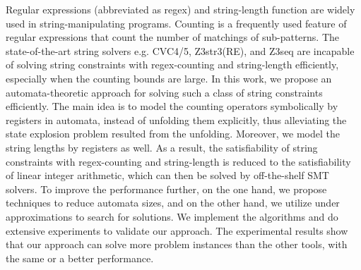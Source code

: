 
%

Regular expressions (abbreviated as regex) and string-length function are widely used in string-manipulating programs. 
Counting is a frequently used feature of regular expressions that count the number of matchings of sub-patterns. The state-of-the-art string solvers e.g. CVC4/5, Z3str3(RE), and Z3seq are incapable of solving string constraints with regex-counting and string-length efficiently, especially when the counting bounds are large. In this work, we propose an automata-theoretic approach for solving such a class of string constraints efficiently. 
%
The main idea is to model the counting operators symbolically by registers in automata, instead of unfolding them explicitly, thus alleviating the state explosion problem resulted from the unfolding.  
%
Moreover, we model the string lengths by registers as well. 
As a result, the satisfiability of string constraints with regex-counting and string-length is reduced to the satisfiability of linear integer arithmetic, which can then be solved by off-the-shelf SMT solvers. 
%
%
To improve the performance further, on the one hand, we propose techniques to reduce automata sizes, 
and on the other hand, we utilize under approximations to search for solutions.   
We implement the algorithms and do extensive experiments to validate our approach. The experimental results show that 
our approach can solve more problem instances than the other tools, with the same or a better performance.



%